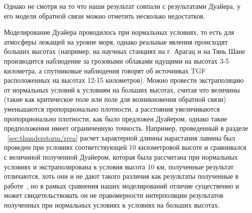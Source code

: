 Однако не смотря на то что наши результат совпали с результатами Дуайера, у его модели обратной связи можно отметить несколько недостатков. 

Моделирование Дуайера проводилось при нормальных условиях, то есть для атмосферы лежащей на уровне моря, однако реальные явления происходят больших высотах (например, на научных станциях на г. Арагац и на Тянь Шане производится наблюдение за грозовыми облаками идущими на высотах 3-5 километра, а спутниковые наблюдения говорят об источниках TGF расположенных на высотах 12-15 километров). Можно провести экстраполяцию от нормальных условий к условиям на больших высотах, считая что величины (такие как критическое  поле или поле для возникновения обратной связи) уменьшаются пропорционально плотности, а расстояния увеличиваются пропорционально плотности, как было предложен Дуайером, однако такие предположения имеет ограниченную точность. Например, проведенный в разделе ~\ref{sec:thunderstorm/rrea} расчет характерной длинны нарастания лавины был проведен при условиях соответствующей 10 километровой высоте и сравнивался с величиной полученной Дуайером, которая была рассчитана при нормальных условиях и экстраполирована к условия высота 10 км, полученные результат отличаются, хоть они и не дают такого различия как результаты полученные в работе~\cite{oreshkin2018}, но в рамках сравнения наших моделирований отличие существенно и может свидетельствовать он не правомерности интерполяции результатов полученных при нормальных условиях к условиях на больших высотах. 

